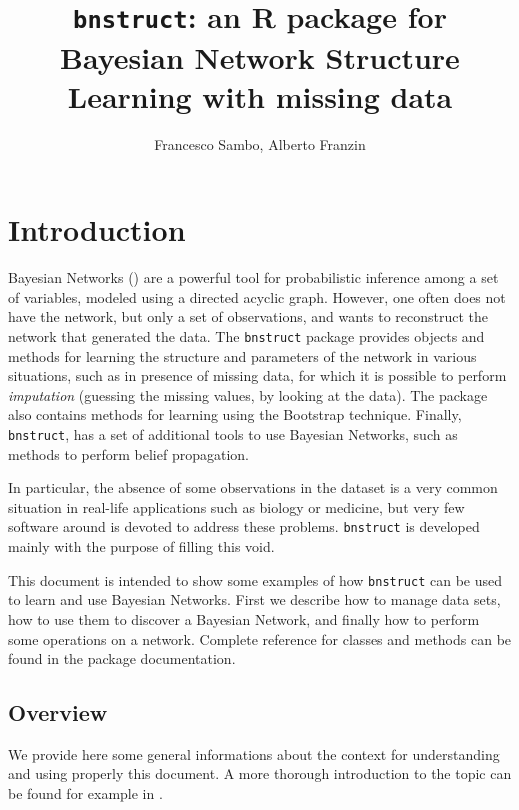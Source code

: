 \documentclass{article}\usepackage[]{graphicx}\usepackage[]{color}
\newcommand{\Rpackage}[1]{{\texttt{#1}}}
\begin{document}
\title{\texttt{bnstruct}: an R package for Bayesian Network Structure Learning with missing data}
\author{Francesco Sambo, Alberto Franzin}
\maketitle



\section{Introduction}
Bayesian Networks (\citet{pearl1988probabilistic}) are a powerful tool for probabilistic inference among a set
of variables, modeled using a directed acyclic graph. However, one often does not
have the network, but only a set of observations, and wants to reconstruct the
network that generated the data. The \Rpackage{bnstruct} package provides objects and methods for
learning the structure and parameters of the network in various situations, such as
in presence of missing data, for which it is possible to perform \textit{imputation}
(guessing the missing values, by looking at the data). The package also contains methods
for learning using the Bootstrap technique.
Finally, \Rpackage{bnstruct}, has a set of additional tools to use Bayesian Networks, such as methods to perform
belief propagation.

In particular, the absence of some observations in the dataset is a very common situation in real-life
applications such as biology or medicine, but very few software around is devoted to address these problems.
\Rpackage{bnstruct} is developed mainly with the purpose of filling this void.

This document is intended to show some examples of how \Rpackage{bnstruct} can be used
to learn and use Bayesian Networks. First we describe how to manage data sets,
how to use them to discover a Bayesian Network, and finally how to perform some
operations on a network. Complete reference for classes and methods can be found in the package documentation.

\subsection{Overview}
We provide here some general informations about the context for understanding
and using properly this document. A more thorough introduction to the topic can be found for example in
\citet{koller2009probabilistic}.
\end{document}
